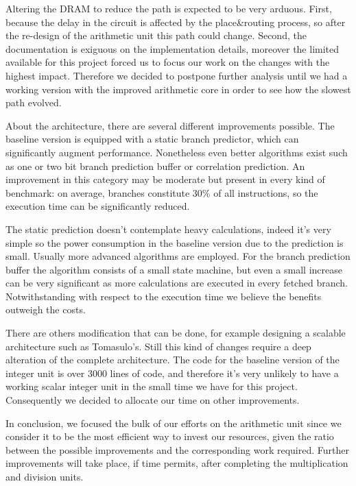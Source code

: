 Altering the DRAM to reduce the path is expected to be very arduous. First, because the delay in the circuit is affected by the place\&routing process, so after the re-design of the arithmetic unit this path could change. Second, the documentation is exiguous on the implementation details, moreover the limited available for this project forced us to focus our work on the changes with the highest impact. Therefore we decided to postpone further analysis until we had a working version with the improved arithmetic core in order to see how the slowest path evolved.

About the architecture, there are several different improvements possible.
The baseline version is equipped with a static branch predictor, which can significantly augment performance. Nonetheless even better algorithms exist such as one or two bit branch prediction buffer or correlation prediction.
An improvement in this category may be moderate but present in every kind of benchmark: on average, branches constitute 30\% of all instructions, so the execution time can be significantly reduced.

The static prediction doesn't contemplate heavy calculations, indeed it's very simple so the power consumption in the baseline version due to the prediction is small. Usually more advanced algorithms are employed. For the branch prediction buffer the algorithm consists of a small state machine, but even a small increase can be very significant as more calculations are executed in every fetched branch. Notwithstanding with respect to the execution time we believe the benefits outweigh the costs.

There are others modification that can be done, for example designing a scalable architecture such as Tomasulo's. Still this kind of changes require a deep alteration of the complete architecture. The code for the baseline version of the integer unit is over 3000 lines of code, and therefore it's very unlikely to have a working scalar integer unit in the small time we have for this project. Consequently we decided to allocate our time on other improvements.

In conclusion, we focused the bulk of our efforts on the arithmetic unit since we consider it to be the most efficient way to invest our resources, given the ratio between the possible improvements and the corresponding work required. Further improvements will take place, if time permits, after completing the multiplication and division units.

